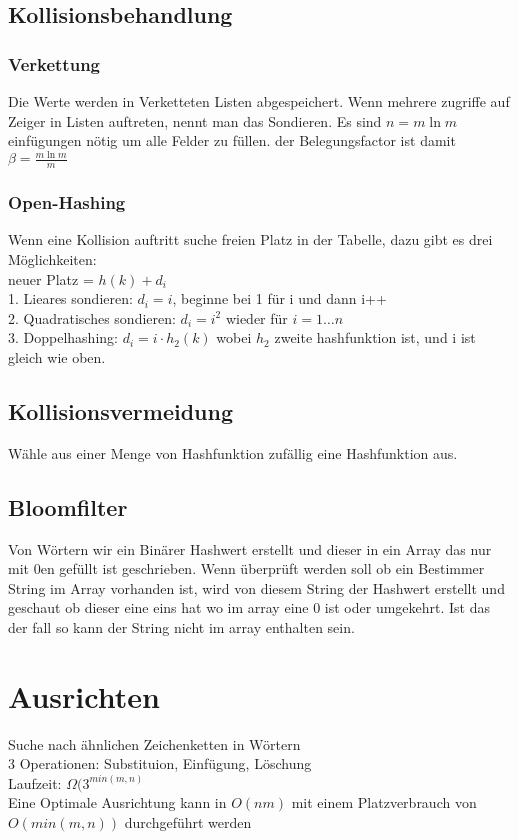 \documentclass[a4paper]{scrartcl}
\begin{document}
\subsection{Kollisionsbehandlung}
\subsubsection{Verkettung}
Die Werte werden in Verketteten Listen abgespeichert. Wenn mehrere zugriffe auf Zeiger in Listen auftreten, nennt man das Sondieren. Es sind $n=m\ln m$ einfügungen nötig um alle Felder zu füllen. der Belegungsfactor ist damit $\beta=\frac{m\ln m}{m}$\\

\subsubsection{Open-Hashing}
Wenn eine Kollision auftritt suche freien Platz in der Tabelle, dazu gibt es drei Möglichkeiten:\\
neuer Platz = $h(k)+d_i$\\
1. Lieares sondieren: $d_i = i$, beginne bei 1 für i und dann i++\\
2. Quadratisches sondieren: $d_i = i^2$ wieder für $i = 1 \dots n$\\
3. Doppelhashing: $d_i = i \cdot h_2(k)$ wobei $h_2$ zweite hashfunktion ist, und i ist gleich wie oben.\\
\subsection{Kollisionsvermeidung}
Wähle aus einer Menge von Hashfunktion zufällig eine Hashfunktion aus.

\subsection{Bloomfilter}
Von Wörtern wir ein Binärer Hashwert erstellt und dieser in ein Array das nur mit 0en gefüllt ist geschrieben. Wenn überprüft werden soll ob ein Bestimmer String im Array vorhanden ist, wird von diesem String der Hashwert erstellt und geschaut ob dieser eine eins hat wo im array eine 0 ist oder umgekehrt. Ist das der fall so kann der String nicht im array enthalten sein.

\section{Ausrichten}
Suche nach ähnlichen Zeichenketten in Wörtern\\
3 Operationen: Substituion, Einfügung, Löschung\\
Laufzeit: $\Omega(3^{min(m,n)}$\\
Eine Optimale Ausrichtung kann in $O(nm)$ mit einem Platzverbrauch von $O(min(m,n))$ durchgeführt werden\\
\end{document}
